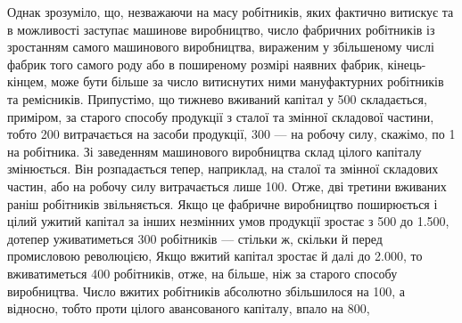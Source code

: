 Однак зрозуміло, що, незважаючи на масу робітників, яких фактично
витискує та в можливості заступає машинове виробництво,
число фабричних робітників із зростанням самого машинового виробництва,
вираженим у збільшеному числі фабрик того самого
роду або в поширеному розмірі наявних фабрик, кінець-кінцем,
може бути більше за число витиснутих ними мануфактурних робітників
та ремісників. Припустімо, що тижнево вживаний капітал
у 500 складається, приміром, за старого способу
продукції з  сталої та  змінної складової частини, тобто 200 витрачається на засоби продукції, 300 — на робочу силу, скажімо, по 1
на робітника. Зі заведенням машинового виробництва склад цілого
капіталу змінюється. Він розпадається тепер, наприклад, на 
сталої та  змінної складових частин, або на робочу силу витрачається
лише 100. Отже, дві третини вживаних
раніш робітників звільняється. Якщо це фабричне виробництво
поширюється і цілий ужитий капітал за інших незмінних умов
продукції зростає з 500 до \num{1.500}, дотепер уживатиметься 300 робітників
— стільки ж, скільки й перед промисловою революцією,
Якщо вжитий капітал зростає й далі до \num{2.000}, то вживатиметься
400 робітників, отже, на  більше, ніж за старого способу виробництва.
Число вжитих робітників абсолютно збільшилося на 100,
а відносно, тобто проти цілого авансованого капіталу, впало на 800,
\parbreak{}  %
